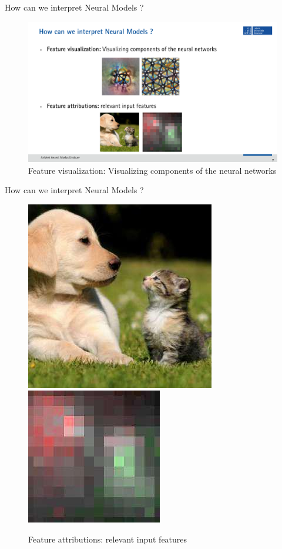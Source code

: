 \documentclass[11pt,compress,t,notes=noshow, aspectratio=169, xcolor=table]{beamer}
\begin{document}
\begin{frame}[c]{How can we interpret Neural Models ?}

	\begin{figure}
	\centering
\hfill

  \includegraphics[width=0.6\linewidth]{slides/gradient-based/figure/iml-grad-vis.pdf}
  
  \caption{Feature visualization: Visualizing components of the neural networks}

\end{figure}
\end{frame}


\begin{frame}[c]{How can we interpret Neural Models ?}

\begin{figure}[h]
	\centering
	\includegraphics[width=0.3\linewidth]{slides/gradient-based/figure/img145.jpg}
	\includegraphics[width=0.3\linewidth]{slides/gradient-based/figure/img149.jpg}
	\caption{Feature attributions: relevant input features}
\end{figure}
\end{frame}

\endlecture
\end{document}
